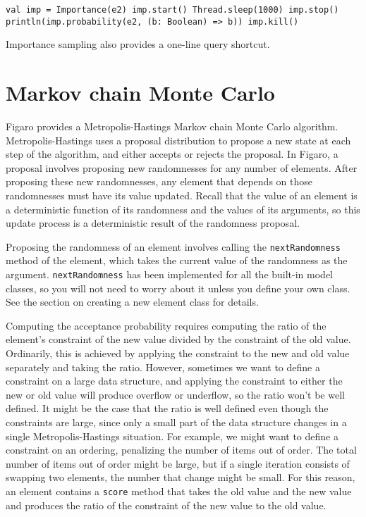 \begin{flushleft}
\texttt{val imp = Importance(e2) 
\newline imp.start() 
\newline Thread.sleep(1000) 
\newline imp.stop()
\newline println(imp.probability(e2, (b: Boolean) => b))
\newline imp.kill() }
\end{flushleft}

Importance sampling also provides a one-line query shortcut.

\section{Markov chain Monte Carlo}

Figaro provides a Metropolis-Hastings Markov chain Monte Carlo algorithm. Metropolis-Hastings uses a proposal distribution to propose a new state at each step of the algorithm, and either accepts or rejects the proposal. In Figaro, a proposal involves proposing new randomnesses for any number of elements. After proposing these new randomnesses, any element that depends on those randomnesses must have its value updated. Recall that the value of an element is a deterministic function of its randomness and the values of its arguments, so this update process is a deterministic result of the randomness proposal.

Proposing the randomness of an element involves calling the \texttt{next\-Randomness} method of the element, which takes the current value of the randomness as the argument. \texttt{nextRandomness} has been implemented for all the built-in model classes, so you will not need to worry about it unless you define your own class. See the section on creating a new element class for details.

Computing the acceptance probability requires computing the ratio of the element's constraint of the new value divided by the constraint of the old value. Ordinarily, this is achieved by applying the
constraint to the new and old value separately and taking the ratio. However, sometimes we want to define a constraint on a large data structure, and applying the constraint to either the new or old value will produce overflow or underflow, so the ratio won't be well defined. It might be the case that the ratio is well defined even though the constraints are large, since only a small part of the data structure changes in a single Metropolis-Hastings situation. For example, we might want to define a constraint on an ordering, penalizing the number of items out of order. The total number of items out of order might be large, but if a single iteration consists of swapping two elements, the number that change might be small. For this reason, an element contains a \texttt{score} method that takes the old value and the new value and produces the ratio of the constraint of the new value to the old value.


